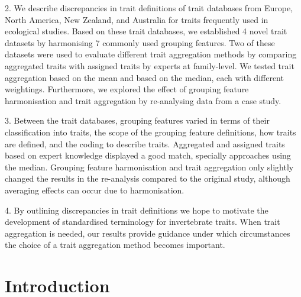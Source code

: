 \documentclass{article}
\begin{document}
2. We describe discrepancies in trait definitions of trait databases from Europe, North America, New Zealand, and Australia for traits frequently used in ecological studies. Based on these trait databases, we established 4 novel trait datasets by harmonising 7 commonly used grouping features. Two of these datasets were used to evaluate different trait aggregation methods by comparing aggregated traits with assigned traits by experts at family-level. We tested trait aggregation based on the mean and based on the median, each with different weightings. Furthermore, we explored the effect of grouping feature harmonisation and trait aggregation by re-analysing data from a case study.

3. Between the trait databases, grouping features varied in terms of their classification into traits, the scope of the grouping feature definitions, how traits are defined, and the coding to describe traits. Aggregated and assigned traits based on expert knowledge displayed a good match, specially approaches using the median. Grouping feature harmonisation and trait aggregation only slightly changed the results in the re-analysis compared to the original study, although averaging effects can occur due to harmonisation.

4. By outlining discrepancies in trait definitions we hope to motivate the development of standardised terminology for invertebrate traits. When trait aggregation is needed, our results provide guidance under which circumstances the choice of a trait aggregation method becomes important. 

\newpage

\section*{Introduction}
\end{document}
